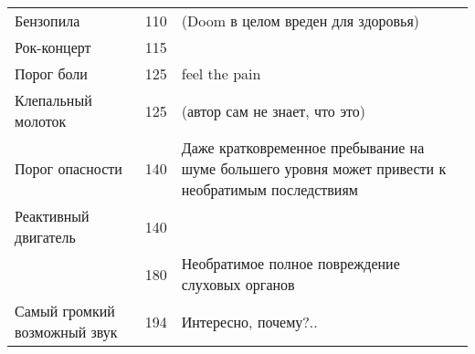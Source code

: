 \begin{center}
\begin{longtable}{|p{}|c|p{}|}
    Бензопила                    & 110   & \small{(Doom в целом вреден для здоровья)}     \\
    Рок-концерт                  & 115   &                                                \\
    \hline
    Порог боли                   & 125   & \small{feel the pain}                          \\
    \hline
    Клепальный молоток           & 125   & \small{(автор сам не знает, что это)}          \\
    \hline
    Порог опасности              & 140   & \small{Даже кратковременное пребывание на
    шуме большего уровня может привести к необратимым последствиям}                       \\
    \hline
    Реактивный двигатель         & 140   &                                                \\
                                 & 180   & \small{Необратимое полное повреждение
                                 слуховых органов}                                        \\
    Самый громкий возможный звук & 194   & \small{Интересно, почему?..}                   \\
  \end{longtable}
\end{center}

